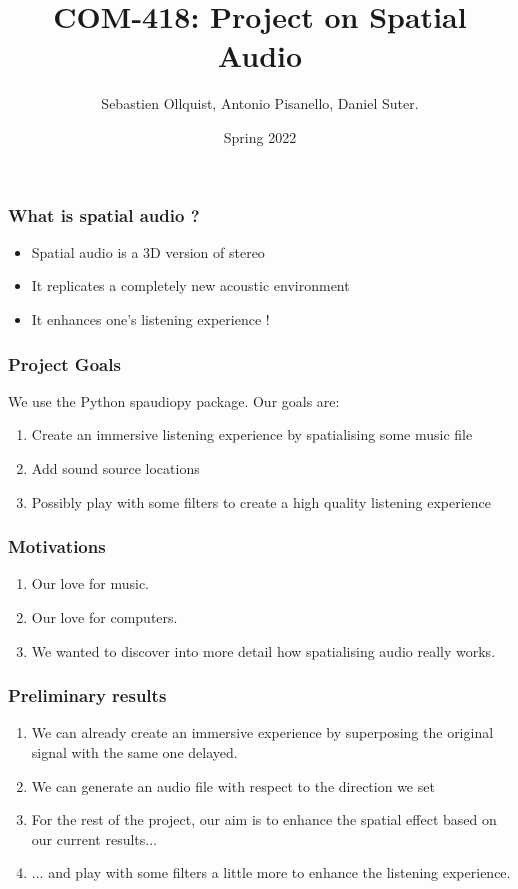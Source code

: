 \documentclass{beamer}
\title{COM-418: Project on Spatial Audio}
\author{Sebastien Ollquist, Antonio Pisanello, Daniel Suter.}
\institute{EPFL}
\date{Spring 2022}
\begin{document}
\frame{\titlepage}

\begin{frame}
    \frametitle{What is spatial audio ?}
    \begin{itemize}
        \item Spatial audio is a 3D version of stereo
        \item It replicates a completely new acoustic environment
        \item It enhances one's listening experience !
    \end{itemize}
\end{frame}

\begin{frame}
    \frametitle{Project Goals}
    We use the Python \textsf{spaudiopy} package. Our goals are:
    \begin{enumerate}
        \item Create an immersive listening experience by spatialising some music file
        \item Add sound source locations
        \item Possibly play with some filters to create a high quality listening experience
    \end{enumerate}
\end{frame}

\begin{frame}
    \frametitle{Motivations}
    \begin{enumerate}
        \item Our love for music.
        \item Our love for computers.
        \item We wanted to discover into more detail how spatialising audio really works.
    \end{enumerate}
\end{frame}

\begin{frame}
    \frametitle{Preliminary results}
    \begin{enumerate}
        \item We can already create an immersive experience by superposing the original signal with the same one delayed.
        \item We can generate an audio file with respect to the direction we set
        \item For the rest of the project, our aim is to enhance the spatial effect based on our current results...
        \item ... and play with some filters a little more to enhance the listening experience.
    \end{enumerate}
\end{frame}
\end{document}
